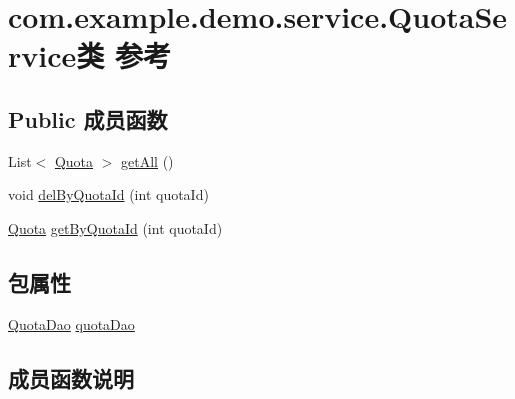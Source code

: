 \hypertarget{classcom_1_1example_1_1demo_1_1service_1_1_quota_service}{}\section{com.\+example.\+demo.\+service.\+Quota\+Service类 参考}
\label{classcom_1_1example_1_1demo_1_1service_1_1_quota_service}
\subsection*{Public 成员函数}
\begin{DoxyCompactItemize}
\item 
List$<$ \mbox{\hyperlink{classcom_1_1example_1_1demo_1_1modular_1_1_quota}{Quota}} $>$ \mbox{\hyperlink{classcom_1_1example_1_1demo_1_1service_1_1_quota_service_adea45f7ee4c67504888c05006ba05034}{get\+All}} ()
\item 
void \mbox{\hyperlink{classcom_1_1example_1_1demo_1_1service_1_1_quota_service_a0eb05554b5f197517e48527a4c925e17}{del\+By\+Quota\+Id}} (int quota\+Id)
\item 
\mbox{\hyperlink{classcom_1_1example_1_1demo_1_1modular_1_1_quota}{Quota}} \mbox{\hyperlink{classcom_1_1example_1_1demo_1_1service_1_1_quota_service_af7048706df84571187e8060b5b705c79}{get\+By\+Quota\+Id}} (int quota\+Id)
\end{DoxyCompactItemize}
\subsection*{包属性}
\begin{DoxyCompactItemize}
\item 
\mbox{\hyperlink{interfacecom_1_1example_1_1demo_1_1dao_1_1_quota_dao}{Quota\+Dao}} \mbox{\hyperlink{classcom_1_1example_1_1demo_1_1service_1_1_quota_service_a7119e367eacb1d8e0d9ab31f30d8f1fd}{quota\+Dao}}
\end{DoxyCompactItemize}


\subsection{成员函数说明}
\mbox{\label{classcom_1_1example_1_1demo_1_1service_1_1_quota_service_a0eb05554b5f197517e48527a4c925e17}} 
